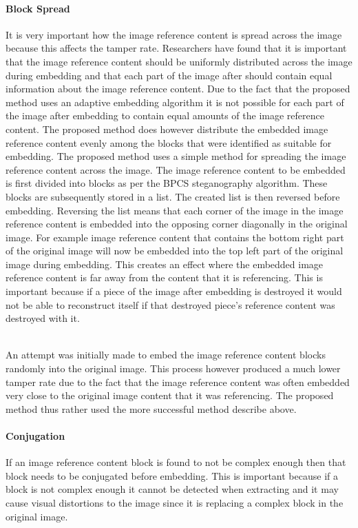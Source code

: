 \documentclass[12pt]{article}
\begin{document}
\paragraph{Block Spread}
It is very important how the image reference content is spread across the image because this affects the tamper rate.
Researchers \cite{korus2013efficient} have found that it is important that the image reference content should be uniformly distributed across the image during embedding and that each part of the image after should contain equal information about the image reference content.
Due to the fact that the proposed method uses an adaptive embedding algorithm it is not possible for each part of the image after embedding to contain equal amounts of the image reference content.
The proposed method does however distribute the embedded image reference content evenly among the blocks that were identified as suitable for embedding.
The proposed method uses a simple method for spreading the image reference content across the image.
The image reference content to be embedded is first divided into blocks as per the BPCS steganography algorithm.
These blocks are subsequently stored in a list. 
The created list is then reversed before embedding.
Reversing the list means that each corner of the image in the image reference content is embedded into the opposing corner diagonally in the original image. For example image reference content that contains the bottom right part of the original image will now be embedded into the top left part of the original image during embedding. 
This creates an effect where the embedded image reference content is far away from the content that it is referencing.
This is important because if a piece of the image after embedding is destroyed it would not be able to reconstruct itself if that destroyed piece's reference content was destroyed with it.

\hspace{0pt} \\
An attempt was initially made to embed the image reference content blocks randomly into the original image.
This process however produced a much lower tamper rate due to the fact that the image reference content was often embedded very close to the original image content that it was referencing.
The proposed method thus rather used the more successful method describe above.

\paragraph{Conjugation}
If an image reference content block is found to not be complex enough then that block needs to be conjugated before embedding.
This is important because if a block is not complex enough it cannot be detected when extracting and it may cause visual distortions to the image since it is replacing a complex block in the original image.
\end{document}
